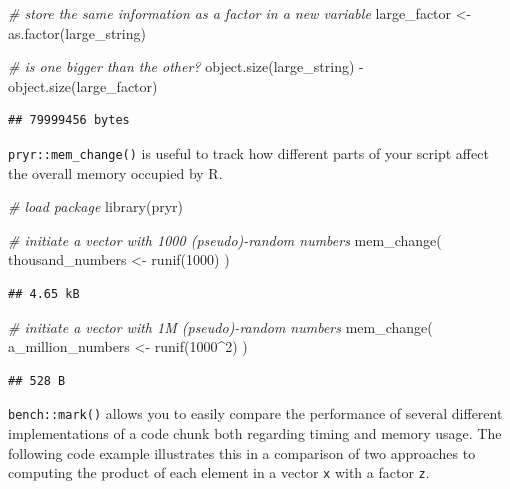 \documentclass[
  12pt,
]{style/krantz}
\newenvironment{Shaded}{\begin{snugshade}}{\end{snugshade}}
\newcommand{\CommentTok}[1]{\textcolor[rgb]{0.56,0.35,0.01}{\textit{#1}}}
\newcommand{\DecValTok}[1]{\textcolor[rgb]{0.00,0.00,0.81}{#1}}
\newcommand{\FunctionTok}[1]{\textcolor[rgb]{0.00,0.00,0.00}{#1}}
\newcommand{\NormalTok}[1]{#1}
\newcommand{\OtherTok}[1]{\textcolor[rgb]{0.56,0.35,0.01}{#1}}
\newcommand{\SpecialCharTok}[1]{\textcolor[rgb]{0.00,0.00,0.00}{#1}}
\begin{document}
\begin{Shaded}
\begin{Highlighting}[]
\CommentTok{\# store the same information as a factor in a new variable}
\NormalTok{large\_factor }\OtherTok{\textless{}{-}} \FunctionTok{as.factor}\NormalTok{(large\_string)}

\CommentTok{\# is one bigger than the other?}
\FunctionTok{object.size}\NormalTok{(large\_string) }\SpecialCharTok{{-}} \FunctionTok{object.size}\NormalTok{(large\_factor)}
\end{Highlighting}
\end{Shaded}

\begin{verbatim}
## 79999456 bytes
\end{verbatim}

\texttt{pryr::mem\_change()} is useful to track how different parts of your script affect the overall memory occupied by R.

\begin{Shaded}
\begin{Highlighting}[]
\CommentTok{\# load package}
\FunctionTok{library}\NormalTok{(pryr)}

\CommentTok{\# initiate a vector with 1000 (pseudo){-}random numbers}
\FunctionTok{mem\_change}\NormalTok{(}
\NormalTok{        thousand\_numbers }\OtherTok{\textless{}{-}} \FunctionTok{runif}\NormalTok{(}\DecValTok{1000}\NormalTok{)}
\NormalTok{        )}
\end{Highlighting}
\end{Shaded}

\begin{verbatim}
## 4.65 kB
\end{verbatim}

\begin{Shaded}
\begin{Highlighting}[]
\CommentTok{\# initiate a vector with 1M (pseudo){-}random numbers}
\FunctionTok{mem\_change}\NormalTok{(}
\NormalTok{        a\_million\_numbers }\OtherTok{\textless{}{-}} \FunctionTok{runif}\NormalTok{(}\DecValTok{1000}\SpecialCharTok{\^{}}\DecValTok{2}\NormalTok{)}
\NormalTok{        )}
\end{Highlighting}
\end{Shaded}

\begin{verbatim}
## 528 B
\end{verbatim}

\texttt{bench::mark()} allows you to easily compare the performance of several different implementations of a code chunk both regarding timing and memory usage. The following code example illustrates this in a comparison of two approaches to computing the product of each element in a vector \texttt{x} with a factor \texttt{z}.
\end{document}
